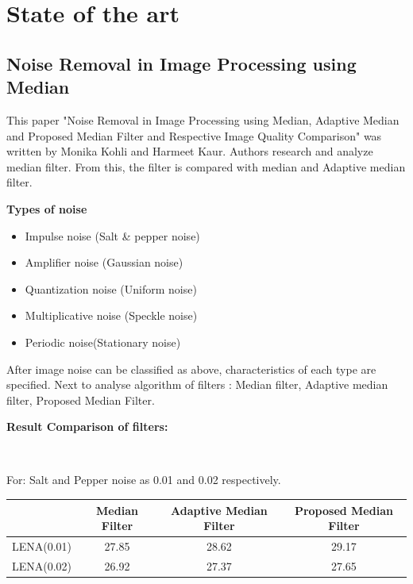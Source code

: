 \chapter{State of the art}
\section{Noise Removal in Image Processing using Median}

This paper "Noise Removal in Image Processing using Median, Adaptive
Median and Proposed Median Filter and Respective Image
Quality Comparison" was written by Monika Kohli and Harmeet Kaur. Authors research and analyze median filter. From this, the filter is compared with median and Adaptive median filter. 
\vspace{1cm}

\textbf{Types of noise}
\begin{itemize}
\item Impulse noise (Salt \& pepper noise)
\item Amplifier noise (Gaussian noise)

\item Quantization noise (Uniform noise)

\item Multiplicative noise (Speckle noise) 
\item Periodic noise(Stationary noise)
\end{itemize}
\vspace{0.5cm}

After image noise can be classified as above, characteristics of each type are specified. Next to analyse algorithm of filters : Median filter, Adaptive median filter, Proposed Median Filter.  
\vspace{1cm}

\textbf{Result Comparison of filters:}

\

For: Salt and Pepper noise as 0.01 and 0.02 respectively. 
\vspace{1cm}

\begin{tabular}{|c|c|c|c|}
\hline 
 & Median Filter & Adaptive Median Filter & Proposed Median Filter \\ 
\hline 
LENA(0.01) & 27.85 & 28.62 & 29.17 \\ 
\hline 
LENA(0.02) & 26.92 & 27.37 & 27.65 \\ 
\hline 
\end{tabular} 
\vspace{1cm}

